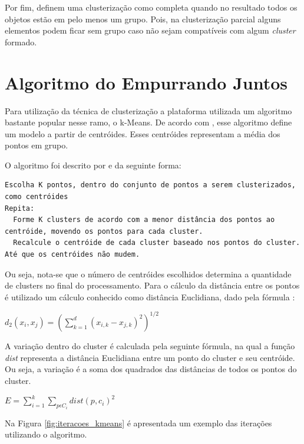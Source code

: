 Por fim,  definem uma clusterização como completa quando no resultado todos os objetos estão em pelo menos um grupo. Pois, na clusterização parcial alguns elementos podem ficar sem grupo caso não sejam compatíveis com algum \textit{cluster} formado.


\section{Algoritmo do Empurrando Juntos}

Para utilização da técnica de clusterização a plataforma utilizada um algoritmo bastante popular nesse ramo, o k-Means.
De acordo com , esse algoritmo define um modelo a partir de centróides. Esses centróides
representam a média dos pontos em grupo.

O algoritmo foi descrito por  e  da seguinte forma:

\lstset{language=HTML, numbers=left, stepnumber=1}
\begin{lstlisting}
Escolha K pontos, dentro do conjunto de pontos a serem clusterizados, como centróides 
Repita:
  Forme K clusters de acordo com a menor distância dos pontos ao centróide, movendo os pontos para cada cluster.
  Recalcule o centróide de cada cluster baseado nos pontos do cluster.
Até que os centróides não mudem.
\end{lstlisting}

Ou seja, nota-se que o número de centróides escolhidos determina a quantidade de clusters no final do processamento.
Para o cálculo da distância entre os pontos é utilizado um cálculo conhecido como distância Euclidiana, dado pela fórmula \cite{clustering_review, tan2013data, han2011data}:

\begin{center}
  $d_2(x_i, x_j) = (\sum_{k=1}^{d} (x_{i,k} - x_{j,k})^2)^{1/2} $
\end{center}

A variação dentro do cluster é calculada pela seguinte fórmula, na qual a 
função \textit{dist} representa a distância Euclidiana entre um ponto do
cluster e seu centróide. Ou seja, a variação é a soma dos quadrados
das distâncias de todos os pontos do cluster.

\begin{center}
  $E = \sum_{i=1}^{k} \sum_{p \epsilon C_i} dist(p, c_i)^2$
\end{center}

Na Figura \ref{fig:iteracoes_kmeans} é apresentada um exemplo das iterações utilizando o algoritmo.

